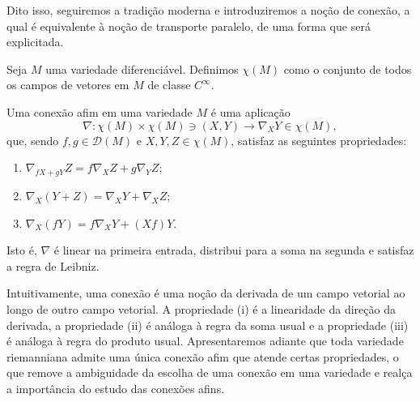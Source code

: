 Dito isso, seguiremos a tradição moderna e introduziremos a noção de conexão, a qual é equivalente à noção de transporte paralelo, de uma forma que será explicitada.
\begin{definition}
	\label{def:conjunto-campos-de-vetores}
	Seja $M$ uma variedade diferenciável. Definimos $\chi(M)$ como o conjunto de todos os campos de vetores em $M$ de classe $C^{\infty}$.
\end{definition}
\begin{definition}
	\label{def:conexao-afim}
	Uma conexão afim em uma variedade $M$ é uma aplicação
	\begin{equation*}
		\nabla:\chi(M)\times \chi(M) \ni (X, Y) \rightarrow \nabla_{X}Y \in \chi(M),
	\end{equation*}
	que, sendo $f, g \in \mathcal{D}(M)$ e $X, Y, Z \in \chi(M)$, satisfaz as seguintes propriedades:
	\begin{enumerate}[label=(\roman*)]
		\item $\nabla_{fX+gY}Z=f\nabla_{X}Z + g\nabla_{Y}Z$;
		\item $\nabla_{X}(Y+Z)=\nabla _XY+\nabla_{X}Z$;
		\item $\nabla_{X}(fY)=f\nabla_{X}Y+(Xf)Y$.
	\end{enumerate}

	Isto é, $\nabla$ é linear na primeira entrada, distribui para a soma na segunda e satisfaz a regra de Leibniz.
\end{definition}
Intuitivamente, uma conexão é uma noção da derivada de um campo vetorial ao longo de outro campo vetorial. A propriedade (i) é a linearidade da direção da derivada, a propriedade (ii) é análoga à regra da soma usual e a propriedade (iii) é análoga à regra do produto usual.  Apresentaremos adiante que toda variedade riemanniana admite uma única conexão afim que atende certas propriedades, o que remove a ambiguidade da escolha de uma conexão em uma variedade e realça a importância do estudo das conexões afins.
